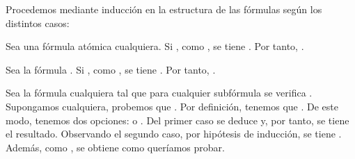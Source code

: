 \begin{isabellebody}
\begin{isamarkuptext}
  \begin{demostracion}
  Procedemos mediante inducción en la estructura de las fórmulas según 
  los distintos casos:

    Sea  una fórmula atómica cualquiera. Si , 
    como , se tiene . 
    Por tanto, .

    Sea la fórmula \isa{{\isasymbottom}}. Si , como , 
    se tiene . Por tanto, 
    .

    Sea la fórmula  cualquiera tal que para cualquier subfórmula 
     se verifica . Supongamos 
     cualquiera, probemos que 
    .
    Por definición, tenemos que . De este 
    modo, tenemos dos opciones:
     o . Del primer caso se deduce  
    y, por tanto, se tiene el
    resultado. Observando el segundo caso, por hipótesis de inducción, 
    se tiene . Además, como 
    , se obtiene 
     como queríamos probar.


\end{demostracion}
\end{isamarkuptext}
\end{isabellebody}
